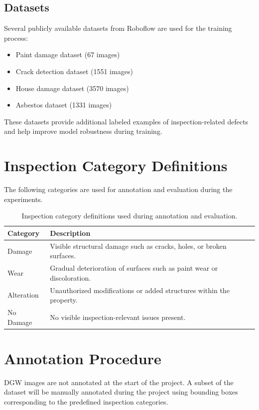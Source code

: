 \subsection{ Datasets}
Several publicly available datasets from Roboflow are used for the training process:

\begin{itemize}
    \item Paint damage dataset (67 images)
    \item Crack detection dataset (1551 images)
    \item House damage dataset (3570 images)
    \item Asbestos dataset (1331 images)
\end{itemize}

These datasets provide additional labeled examples of inspection-related defects and help improve model robustness during training.

\section{Inspection Category Definitions}

The following categories are used for annotation and evaluation during the experiments.

\begin{table}[H]
\centering
\begin{tabular}{|p{3cm}|p{8cm}|}
\hline
\textbf{Category} & \textbf{Description} \\
\hline
Damage & Visible structural damage such as cracks, holes, or broken surfaces. \\
\hline
Wear & Gradual deterioration of surfaces such as paint wear or discoloration. \\
\hline
Alteration & Unauthorized modifications or added structures within the property. \\
\hline
No Damage & No visible inspection-relevant issues present. \\
\hline
\end{tabular}
\caption{Inspection category definitions used during annotation and evaluation.}
\label{tab:inspection_categories}
\end{table}

\section{Annotation Procedure}

DGW images are not annotated at the start of the project. A subset of the dataset will be manually annotated during the project using bounding boxes corresponding to the predefined inspection categories.

